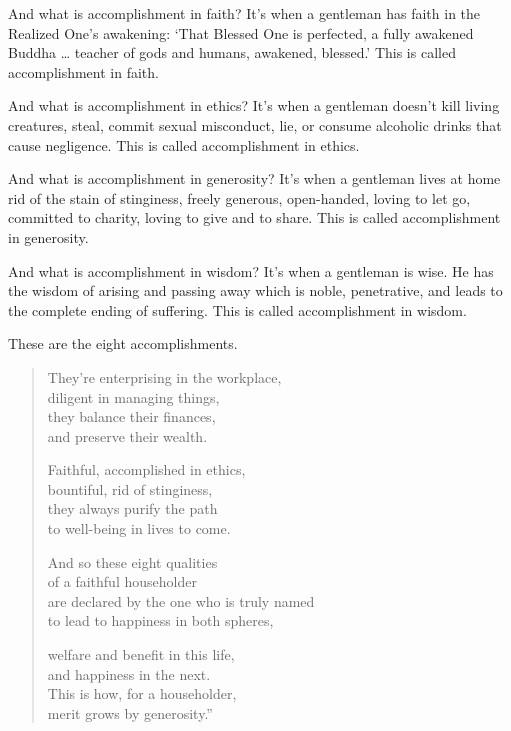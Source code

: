 \documentclass[12pt,openany]{book}%
\begin{document}
And what is accomplishment in faith? It’s when a gentleman has faith in the Realized One’s awakening: ‘That Blessed One is perfected, a fully awakened Buddha … teacher of gods and humans, awakened, blessed.’ This is called accomplishment in faith. 

And what is accomplishment in ethics? It’s when a gentleman doesn’t kill living creatures, steal, commit sexual misconduct, lie, or consume alcoholic drinks that cause negligence. This is called accomplishment in ethics. 

And what is accomplishment in generosity? It’s when a gentleman lives at home rid of the stain of stinginess, freely generous, open-handed, loving to let go, committed to charity, loving to give and to share. This is called accomplishment in generosity. 

And what is accomplishment in wisdom? It’s when a gentleman is wise. He has the wisdom of arising and passing away which is noble, penetrative, and leads to the complete ending of suffering. This is called accomplishment in wisdom. 

These are the eight accomplishments. 

\begin{verse}%
They’re enterprising in the workplace, \\
diligent in managing things, \\
they balance their finances, \\
and preserve their wealth. 

Faithful, accomplished in ethics, \\
bountiful, rid of stinginess, \\
they always purify the path \\
to well-being in lives to come. 

And so these eight qualities \\
of a faithful householder \\
are declared by the one who is truly named \\
to lead to happiness in both spheres, 

welfare and benefit in this life, \\
and happiness in the next. \\
This is how, for a householder, \\
merit grows by generosity.” 

%
\end{verse}
\end{document}
